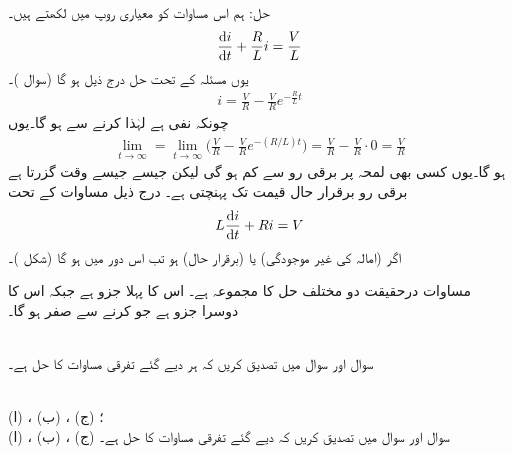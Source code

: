 حل:\quad
ہم اس مساوات کو معیاری روپ میں لکھتے ہیں۔
\begin{align}\label{مساوات_ماورائی_سلسلہ_وار_تفرقی}
\frac{\dif i}{\dif t}+\frac{R}{L}i=\frac{V}{L}
\end{align}
یوں مسئلہ  کے تحت حل درج ذیل ہو گا (سوال )۔
\begin{align}\label{مساوات_ماورائی_سلسلہ_وار_دور_حل}
i=\frac{V}{R}-\frac{V}{R}e^{-\tfrac{R}{L}t}
\end{align}
چونکہ  نفی ہے لہٰذا  کرنے سے  ہو گا۔یوں 
\begin{align*}
\lim_{t\to \infty}=\lim_{t\to \infty}\big(\frac{V}{R}-\frac{V}{R}e^{-(R/L)t}\big)=\frac{V}{R}-\frac{V}{R}\cdot 0=\frac{V}{R}
\end{align*}
ہو گا۔یوں کسی بھی لمحہ پر برقی رو  سے کم ہو گی لیکن جیسے جیسے وقت گزرتا ہے برقی رو برقرار حال قیمت  تک پہنچتی ہے۔  درج ذیل مساوات کے تحت
\begin{align*}
L\frac{\dif i}{\dif t}+Ri=V
\end{align*}
اگر  (امالہ کی غیر موجودگی) یا  (برقرار حال) ہو تب اس دور میں  ہو گا (شکل )۔

مساوات  درحقیقت دو مختلف حل کا مجموعہ ہے۔ اس کا پہلا جزو    ہے جبکہ اس کا دوسرا جزو    ہے جو  کرنے سے صفر ہو گا۔

\\
سوال  اور سوال  میں تصدیق کریں کہ ہر  دیے گئے تفرقی مساوات کا حل ہے۔

\\
 (ا) ، (ب) ، (ج) 
؛\\
(ا) ، (ب) ، (ج) 
سوال  اور سوال  میں تصدیق کریں کہ  دیے گئے تفرقی مساوات کا حل ہے۔

